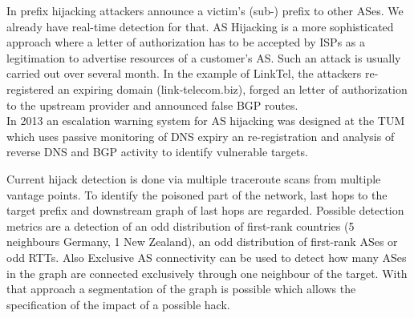 In prefix hijacking attackers announce a victim's (sub-) prefix to other ASes.
We already have real-time detection for that.
AS Hijacking is a more sophisticated approach where a letter of authorization has to be accepted by ISPs as a legitimation to advertise resources of a customer's AS\@.
Such an attack is usually carried out over several month.
In the example of LinkTel, the attackers re-registered an expiring domain (link-telecom.biz), forged an letter of authorization to the upstream provider and announced false BGP routes.\\
In 2013 an escalation warning system for AS hijacking was designed at the TUM which uses passive monitoring of DNS expiry an re-registration and analysis of reverse DNS and BGP activity to identify vulnerable targets.

Current hijack detection is done via multiple traceroute scans from multiple vantage points.
To identify the poisoned part of the network, last hops to the target prefix and downstream graph of last hops are regarded.
Possible detection metrics are a detection of an odd distribution of first-rank countries (5 neighbours Germany, 1 New Zealand), an odd distribution of first-rank ASes or odd RTTs.
Also Exclusive AS connectivity can be used to detect how many ASes in the graph are connected exclusively through one neighbour of the target.
With that approach a segmentation of the graph is possible which allows the specification of the impact of a possible hack.\\
